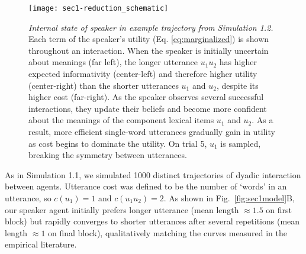 \begin{figure}[t]
\centering
    \texttt{[image: sec1-reduction\_schematic]}
  \caption{\emph{Internal state of speaker in example trajectory from Simulation 1.2.} Each term of the speaker's utility (Eq. \ref{eq:marginalized}) is shown throughout an interaction. When the speaker is initially uncertain about meanings (far left), the longer utterance $u_1u_2$ has higher expected informativity (center-left) and therefore higher utility (center-right) than the shorter utterances $u_1$ and $u_2$, despite its higher cost (far-right). As the speaker observes several successful interactions, they update their beliefs and become more confident about the meanings of the component lexical items $u_1$ and $u_2$. As a result, more efficient single-word utterances gradually gain in utility as cost begins to dominate the utility. On trial 5, $u_1$ is sampled, breaking the symmetry between utterances.}
  \label{fig:sec1internals}
\end{figure}

As in Simulation 1.1, we simulated 1000 distinct trajectories of dyadic interaction between agents.
Utterance cost was defined to be the number of `words' in an utterance, so $c(u_1) =1$ and $c(u_1u_2)=2$.
As shown in Fig.~\ref{fig:sec1model}B, our speaker agent initially prefers longer utterance (mean length $\approx 1.5$ on first block) but rapidly converges to shorter utterances after several repetitions (mean length $\approx 1$ on final block), qualitatively matching the curves measured in the empirical literature.

